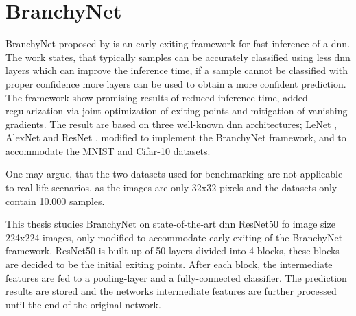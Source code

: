 \section{BranchyNet}

BranchyNet \cite{teerapittayanon_branchynet:_2016} proposed by \citeauthor{teerapittayanon_branchynet:_2016} is an early exiting framework for fast inference of a \gls{dnn}. The work states, that typically samples can be accurately classified using less \gls{dnn} layers which can improve the inference time, if a sample cannot be classified with proper confidence more layers can be used to obtain a more confident prediction. The framework show promising results of reduced inference time, added regularization via joint optimization of exiting points and mitigation of vanishing gradients. The result are based on three well-known \gls{dnn} architectures; LeNet \cite{bibid}, AlexNet \cite{bibid} and ResNet \cite{he_deep_2015}, modified to implement the BranchyNet framework, and to accommodate the MNIST \cite{bibid} and Cifar-10 \cite{bibid} datasets. 

One may argue, that the two datasets used for benchmarking are not applicable to real-life scenarios, as the images are only 32x32 pixels and the datasets only contain 10.000 samples.

This thesis studies BranchyNet on state-of-the-art \gls{dnn} ResNet50 fo image size 224x224 images, only modified to accommodate early exiting of the BranchyNet framework. ResNet50 is built up of 50 layers divided into 4 blocks, these blocks are decided to be the initial exiting points. After each block, the intermediate features are fed to a pooling-layer and a fully-connected classifier. The prediction results are stored and the networks intermediate features are further processed until the end of the original network.

